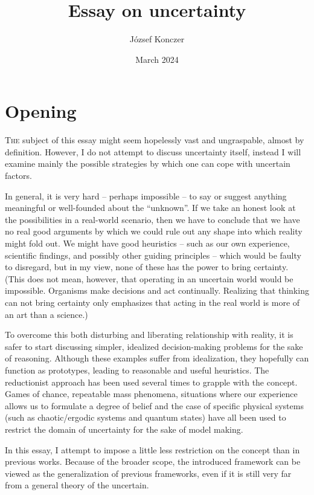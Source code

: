 \documentclass{article}
\title{{\bf Essay on uncertainty} \\ \pgfornament[height=0.8cm]{84}}
\author{József Konczer}
\date{March 2024}
\begin{document}
\maketitle

\section*{Opening}

\lettrine[lines=2]{T}{he} subject of this essay might seem hopelessly vast and ungraspable, almost by definition.
However, I do not attempt to discuss uncertainty itself, instead I will examine mainly the possible strategies by which one can cope with uncertain factors.

In general, it is very hard – perhaps impossible – to say or suggest anything meaningful or well-founded about the ``unknown''. If we take an honest look at the possibilities in a real-world scenario, then we have to conclude that we have no real good arguments by which we could rule out any shape into which reality might fold out. We might have good heuristics – such as our own experience, scientific findings, and possibly other guiding principles – which would be faulty to disregard, but in my view, none of these has the power to bring certainty.
(This does not mean, however, that operating in an uncertain world would be impossible. Organisms make decisions and act continually. Realizing that thinking can not bring certainty only emphasizes that acting in the real world is more of an art than a science.)

To overcome this both disturbing and liberating relationship with reality, it is safer to start discussing simpler, idealized decision-making problems for the sake of reasoning.
Although these examples suffer from idealization, they hopefully can function as prototypes, leading to reasonable and useful heuristics.
The reductionist approach has been used several times to grapple with the concept.
Games of chance, repeatable mass phenomena, situations where our experience allows us to formulate a degree of belief and the case of specific physical systems (such as chaotic/ergodic systems and quantum states) have all been used to restrict the domain of uncertainty for the sake of model making.

In this essay, I attempt to impose a little less restriction on the concept than in previous works.
Because of the broader scope, the introduced framework can be viewed as the generalization of previous frameworks, even if it is still very far from a general theory of the uncertain.
\end{document}
